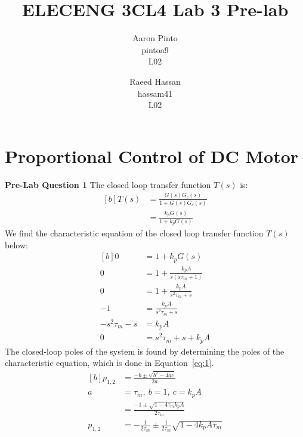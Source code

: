 \documentclass[12pt]{article}
\title{ELECENG 3CL4 Lab 3 Pre-lab}
\author{
    Aaron Pinto \\
    pintoa9 \\
    L02
    \and
    Raeed Hassan \\
    hassam41 \\
    L02
}
\begin{document}
\maketitle
\clearpage

\section{Proportional Control of DC Motor}
\textbf{Pre-Lab Question 1}
The closed loop transfer function $T(s)$ is:
\begin{equation*}
\begin{aligned}[b]
    T(s) &= \frac{G(s)G_c(s)}{1 + G(s)G_c(s)} \\
    &= \frac{k_pG(s)}{1 + k_pG(s)}
\end{aligned}
\end{equation*}
We find the characteristic equation of the closed loop transfer function $T(s)$ below: 
\begin{equation*}
\begin{aligned}[b]
    0 &= 1 + k_pG(s) \\
    0 &= 1 + \frac{k_pA}{s(s\tau_m + 1)} \\
    0 &= 1 + \frac{k_pA}{s^2\tau_m + s} \\
    -1 &= \frac{k_pA}{s^2\tau_m + s} \\
    -s^2\tau_m - s &= k_pA \\
    0 &= s^2\tau_m + s + k_pA
\end{aligned}
\end{equation*}
The closed-loop poles of the system is found by determining the poles of the characteristic equation, which is done in Equation~\ref{eq:1}.  
\begin{equation} \label{eq:1}
\begin{aligned}[b]
    p_{1,2} &= \frac{-b \pm \sqrt{b^2 - 4ac}}{2a} \\
    a &= \tau_m, \ b = 1, \ c = k_pA \\
    &= \frac{-1 \pm \sqrt{1 - 4\tau_m k_p A}}{2\tau_m} \\
    p_{1,2} &= -\frac{1}{2\tau_m} \pm \frac{1}{2\tau_m}\sqrt{1 - 4k_p A \tau_m}
\end{aligned}
\end{equation}
\end{document}
